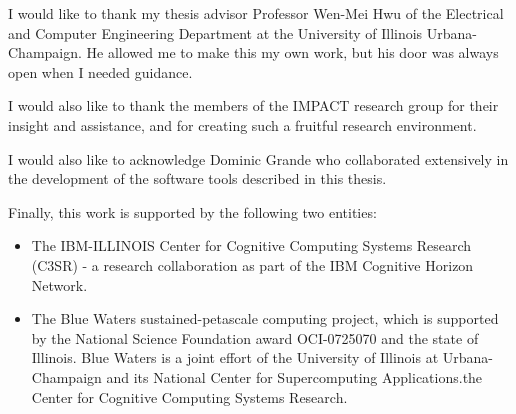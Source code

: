 I would like to thank my thesis advisor Professor Wen-Mei Hwu of the Electrical and Computer Engineering Department at the University of Illinois Urbana-Champaign.
He allowed me to make this my own work, but his door was always open when I needed guidance.

I would also like to thank the members of the IMPACT research group for their insight and assistance, and for creating such a fruitful research environment.

I would also like to acknowledge Dominic Grande who collaborated extensively in the development of the software tools described in this thesis.

Finally, this work is supported by the following two entities:
\begin{itemize}
    \item The IBM-ILLINOIS Center for Cognitive Computing Systems Research (C3SR) - a research collaboration as part of the IBM Cognitive Horizon Network.
    \item The Blue Waters sustained-petascale computing project, which is supported by the National Science Foundation award OCI-0725070 and the state of Illinois. 
Blue Waters is a joint effort of the University of Illinois at Urbana-Champaign and its National Center for Supercomputing Applications.the Center for Cognitive Computing Systems Research.
\end{itemize}